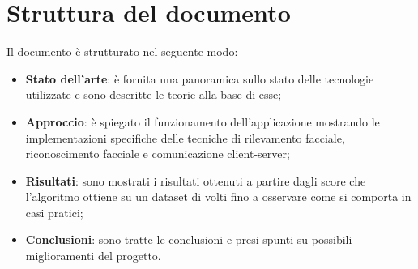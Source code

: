 \section{Struttura del documento}
Il documento è strutturato nel seguente modo:
\begin{itemize}
	\item \textbf{Stato dell'arte}: è fornita una panoramica sullo stato delle tecnologie utilizzate e sono descritte le teorie alla base di esse;
	\item \textbf{Approccio}: è spiegato il funzionamento dell'applicazione mostrando le implementazioni specifiche delle tecniche di rilevamento facciale, riconoscimento facciale e comunicazione client-server;
	\item \textbf{Risultati}: sono mostrati i risultati ottenuti a partire dagli score che l'algoritmo ottiene su un dataset di volti fino a osservare come si comporta in casi pratici;
	\item \textbf{Conclusioni}: sono tratte le conclusioni e presi spunti su possibili miglioramenti del progetto.
\end{itemize}
